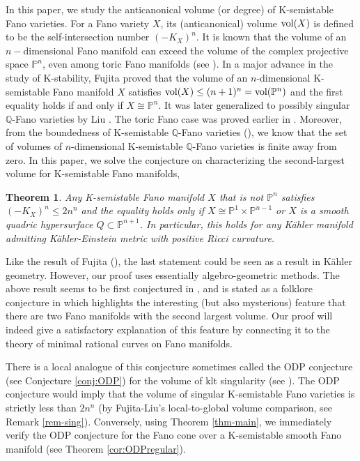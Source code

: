 \documentclass[12pt]{amsart}
\newcommand{\hvol}{{\widehat{\rm vol}}}
\newtheorem{thm}{Theorem}[section]
\theoremstyle{definition}
\def\vol{{\rm vol}}
\newcommand{\IP}{{\mathbb P}}
\newcommand{\IQ}{{\mathbb Q}}
\begin{document}
In this paper, we study the anticanonical volume (or degree) of K-semistable Fano varieties. For a Fano variety $X$, its (anticanonical) volume $\vol(X)$ is defined to be the self-intersection number $(-K_X)^n$. It is known that the volume of an $n-$dimensional Fano manifold can exceed the volume of the complex projective space $\IP^n$, even among toric Fano manifolds (see \cite[Section 5.11]{Deb01}). 
In a major advance in the study of K-stability, Fujita \cite{Fuj18} proved that the volume of an $n$-dimensional K-semistable Fano manifold $X$ satisfies $\vol(
X)\le (n+1)^n=\vol(\IP^n)$ and the first equality holds if and only if $X\cong \IP^n$. It was later generalized to possibly singular $\IQ$-Fano varieties by Liu \cite{Liu18}. The toric Fano case was proved earlier in \cite{BB17}. Moreover, from the boundedness of K-semistable $\IQ$-Fano varieties (\cite[Corollary 1.2]{Jia17}), we know that the set of volumes of $n$-dimensional K-semistable $\IQ$-Fano varieties is finite away from zero. In this paper, we %
solve the conjecture on characterizing the second-largest volume for K-semistable Fano manifolds,
\begin{thm}\label{conj:2ndVol}\label{thm-main}
Any K-semistable Fano manifold $X$ that is not $\IP^n$ satisfies $(-K_X)^n\le 2n^n$ and the equality holds only if $X\cong \IP^1\times \IP^{n-1}$ or $X$ is a smooth quadric hypersurface $Q\subset \IP^{n+1}$. In particular, this holds for any K\"ahler manifold admitting K\"{a}hler-Einstein metric with positive Ricci curvature. 
\end{thm}
Like the result of Fujita (\cite{Fuj18}), the last statement could be seen as a result in K\"{a}hler geometry. However, our proof uses essentially algebro-geometric methods. The above result seems to be first conjectured in \cite[Problem 2.6]{AIM}, and is stated as a folklore conjecture in \cite[Conjecture 6.8]{Zhuang25} which highlights the interesting (but also mysterious) feature that there are two Fano manifolds with the second largest volume. Our proof will indeed give a satisfactory explanation of this feature by connecting it to the theory of minimal rational curves on Fano manifolds. 

There is a local analogue of this conjecture sometimes called the ODP conjecture (see Conjecture \ref{conj:ODP}) for the volume of klt singularity (see \cite{SS17,LX19}). %
The ODP conjecture would imply that the volume of singular K-semistable Fano varieties is strictly less than $2 n^n$ (by Fujita-Liu's local-to-global volume comparison, see Remark \ref{rem-sing}). Conversely, using Theorem \ref{thm-main}, we immediately verify the ODP conjecture for the Fano cone over a K-semistable smooth Fano manifold (see Theorem \ref{cor:ODPregular}). 
\end{document}

